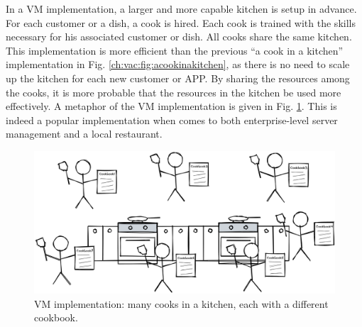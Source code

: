 In a VM implementation, a larger and more capable kitchen is setup in advance. For each customer or a dish, a cook is hired. Each cook is trained with the skills necessary for his associated customer or dish. All cooks share the same kitchen. This implementation is more efficient than the previous ``a cook in a kitchen'' implementation in Fig. \ref{ch:vac:fig:acookinakitchen}, as there is no need to scale up the kitchen for each new customer or APP. By sharing the resources among the cooks, it is more probable that the resources in the kitchen be used more effectively. A metaphor of the VM implementation is given in Fig. \ref{ch:vac:fig:manycooksinakitchen}. This is indeed a popular implementation when comes to both enterprise-level server management and a local restaurant.
\begin{figure}
	\centering
	\includegraphics[width=350pt]{chapters/ch_virtualization_and_containerization/figures/manycooksinakitchen.png}
	\caption{VM implementation: many cooks in a kitchen, each with a different cookbook.} \label{ch:vac:fig:manycooksinakitchen}
\end{figure}

